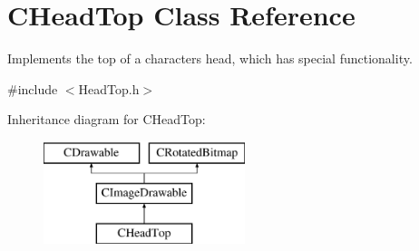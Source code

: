 \hypertarget{class_c_head_top}{\section{C\+Head\+Top Class Reference}
\label{class_c_head_top}
}


Implements the top of a characters head, which has special functionality.  




{\ttfamily \#include $<$Head\+Top.\+h$>$}

Inheritance diagram for C\+Head\+Top\+:\begin{figure}[H]
\begin{center}
\leavevmode
\includegraphics[height=3.000000cm]{class_c_head_top}
\end{center}
\end{figure}
